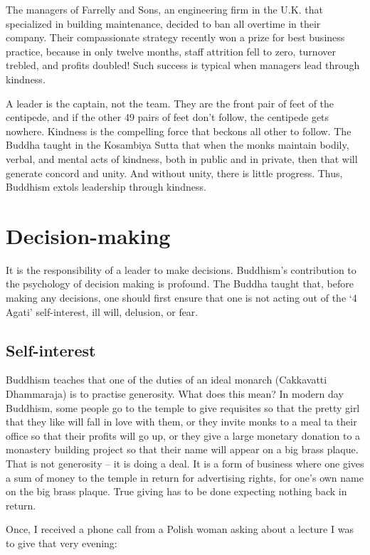 \documentclass[11pt, openany]{book}
\begin{document}
The managers of Farrelly and Sons, an engineering firm in the U.K. that specialized in building maintenance, decided to ban all overtime in their company. Their compassionate strategy recently won a prize for best business practice, because in only twelve months, staff attrition fell to zero, turnover trebled, and profits doubled! Such success is typical when managers lead through kindness.

A leader is the captain, not the team. They are the front pair of feet of the centipede, and if the other 49 pairs of feet don’t follow, the centipede gets nowhere. Kindness is the compelling force that beckons all other to follow. The Buddha taught in the Kosambiya Sutta that when the monks maintain bodily, verbal, and mental acts of kindness, both in public and in private, then that will generate concord and unity. And without unity, there is little progress. Thus, Buddhism extols leadership through kindness.

\chapter{Decision-making}

It is the responsibility of a leader to make decisions. Buddhism’s contribution to the psychology of decision making is profound. The Buddha taught that, before making any decisions, one should first ensure that one is not acting out of the ‘4 Agati’ self-interest, ill will, delusion, or fear.

\section{Self-interest}

Buddhism teaches that one of the duties of an ideal monarch (Cakkavatti Dhammaraja) is to practise generosity. What does this mean? In modern day Buddhism, some people go to the temple to give requisites so that the pretty girl that they like will fall in love with them, or they invite monks to a meal ta their office so that their profits will go up, or they give a large monetary donation to a monastery building project so that their name will appear on a big brass plaque. That is not generosity – it is doing a deal. It is a form of business where one gives a sum of money to the temple in return for advertising rights, for one’s own name on the big brass plaque. True giving has to be done expecting nothing back in return.

Once, I received a phone call from a Polish woman asking about a lecture I was to give that very evening:
\end{document}
